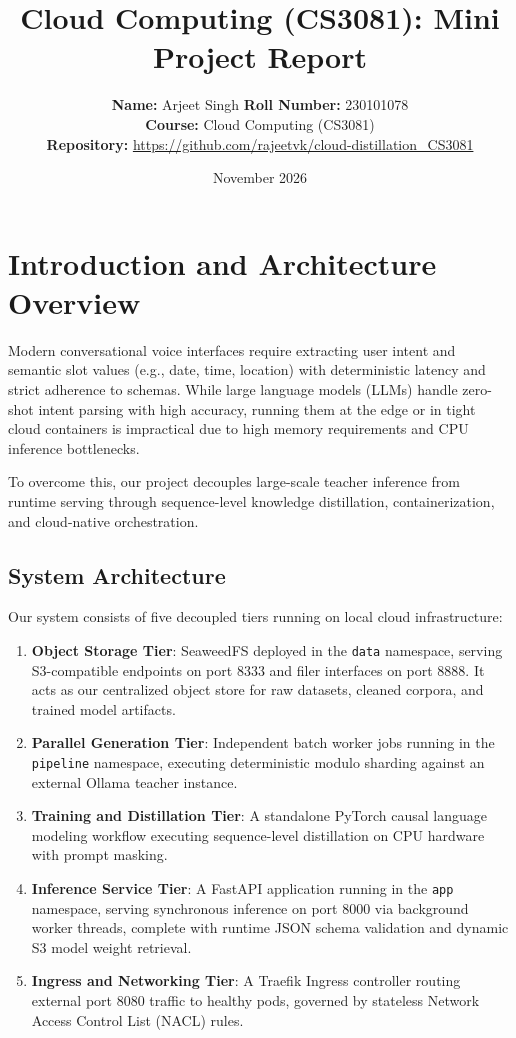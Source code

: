 \documentclass[10pt,a4paper]{article}
\title{\textbf{Cloud Computing (CS3081): Mini Project Report}}
\author{\textbf{Name:} Arjeet Singh \quad \textbar \quad \textbf{Roll Number:} 230101078 \\
\textbf{Course:} Cloud Computing (CS3081) \\
\textbf{Repository:} \url{https://github.com/rajeetvk/cloud-distillation_CS3081}}
\date{November 2026}
\begin{document}
\maketitle

\section{Introduction and Architecture Overview}
Modern conversational voice interfaces require extracting user intent and semantic slot values (e.g., date, time, location) with deterministic latency and strict adherence to schemas. While large language models (LLMs) handle zero-shot intent parsing with high accuracy, running them at the edge or in tight cloud containers is impractical due to high memory requirements and CPU inference bottlenecks. 

To overcome this, our project decouples large-scale teacher inference from runtime serving through sequence-level knowledge distillation, containerization, and cloud-native orchestration.

\subsection{System Architecture}
Our system consists of five decoupled tiers running on local cloud infrastructure:
\begin{enumerate}
    \item \textbf{Object Storage Tier}: SeaweedFS deployed in the \texttt{data} namespace, serving S3-compatible endpoints on port 8333 and filer interfaces on port 8888. It acts as our centralized object store for raw datasets, cleaned corpora, and trained model artifacts.
    \item \textbf{Parallel Generation Tier}: Independent batch worker jobs running in the \texttt{pipeline} namespace, executing deterministic modulo sharding against an external Ollama teacher instance.
    \item \textbf{Training and Distillation Tier}: A standalone PyTorch causal language modeling workflow executing sequence-level distillation on CPU hardware with prompt masking.
    \item \textbf{Inference Service Tier}: A FastAPI application running in the \texttt{app} namespace, serving synchronous inference on port 8000 via background worker threads, complete with runtime JSON schema validation and dynamic S3 model weight retrieval.
    \item \textbf{Ingress and Networking Tier}: A Traefik Ingress controller routing external port 8080 traffic to healthy pods, governed by stateless Network Access Control List (NACL) rules.
\end{enumerate}
\end{document}
